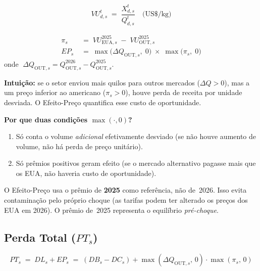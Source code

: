 \documentclass[12pt, a4paper]{article}
\begin{document}
\begin{equation}
  VU_{d,s}^{t} \;=\; \frac{X_{d,s}^{t}}{Q_{d,s}^{t}}
  \quad\text{(US\$/kg)}
  \label{eq:vu}
\end{equation}

\begin{formulabox}
\begin{align}
  \pi_s
    &\;=\; VU_{\text{EUA},s}^{2025} \;-\; VU_{\text{OUT},s}^{2025}
    \label{eq:premio} \\[6pt]
  EP_s
    &\;=\; \max\!\bigl(\Delta Q_{\text{OUT},s},\;0\bigr)
           \;\times\;
           \max\!\bigl(\pi_s,\;0\bigr)
    \label{eq:ep}
\end{align}
onde $\;\Delta Q_{\text{OUT},s} = Q_{\text{OUT},s}^{2026} - Q_{\text{OUT},s}^{2025}$.
\end{formulabox}

\noindent\textbf{Intuição:} se o setor enviou mais quilos para outros mercados
($\Delta Q > 0$), mas a um preço inferior ao americano ($\pi_s > 0$), houve
perda de receita por unidade desviada. O Efeito-Preço quantifica esse
custo de oportunidade.

\noindent\textbf{Por que duas condições $\max(\cdot,0)$?}
\begin{enumerate}[noitemsep]
  \item Só conta o volume \emph{adicional} efetivamente desviado
    (se não houve aumento de volume, não há perda de preço unitário).
  \item Só prêmios positivos geram efeito
    (se o mercado alternativo pagasse mais que os EUA, não haveria custo de oportunidade).
\end{enumerate}

\begin{atencaobox}
O Efeito-Preço usa o prêmio de \textbf{2025} como referência, não de~2026.
Isso evita contaminação pelo próprio choque (as tarifas podem ter alterado
os preços dos EUA em 2026). O prêmio de~2025 representa o equilíbrio
\emph{pré-choque}.
\end{atencaobox}

\subsection{Perda Total (\texorpdfstring{$PT_s$}{PT})}

\begin{formulabox}
\begin{equation}
  PT_s
    \;=\; DL_s + EP_s
    \;=\; (DB_s - DC_s)
          + \max(\Delta Q_{\text{OUT},s},\,0)\cdot\max(\pi_s,\,0)
  \label{eq:pt}
\end{equation}
\end{formulabox}
\end{document}
